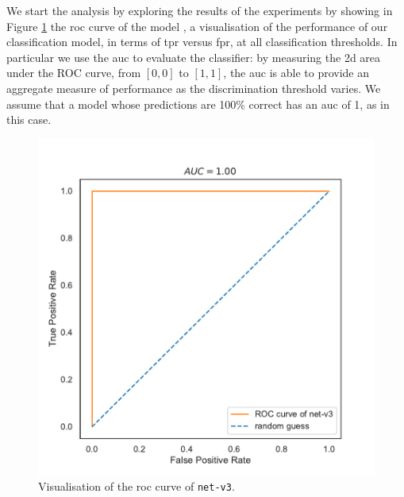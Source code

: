 We start the analysis by exploring the results of the experiments by showing in 
Figure \ref{fig:net-v3auc} the \gls{roc} curve of the model 
\cite[see][]{fawcett2006introduction}, a visualisation of the performance of our 
classification model, in terms of \gls{tpr} versus \gls{fpr}, at all classification 
thresholds.
In particular we use the \gls{auc} to evaluate the classifier: by measuring the 
\gls{2d} area under the ROC curve, from $[0, 0]$ to $[1, 1]$, the \gls{auc} is able 
to provide an aggregate measure of performance as the discrimination threshold 
varies.
We assume that a model whose predictions are 100\% correct has an \gls{auc} of 
1, as in this case.
\begin{figure}[!htb]
	\centering
	\includegraphics[width=.45\textwidth]{contents/images/net-v3/roc-net-v3(a)}%
	\caption[Evaluation of the \gls{roc} of \texttt{net-v3}.]{Visualisation of the 
		\gls{roc} curve of \texttt{net-v3}.}
	\label{fig:net-v3auc}
\end{figure}



